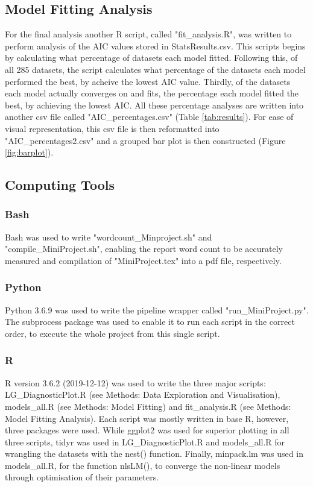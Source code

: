 \documentclass[11pt, a4paper]{article} %
\begin{document}
\subsection{Model Fitting Analysis}

For the final analysis another R script, called "fit\_analysis.R", was written to perform analysis of the AIC values stored in StatsResults.csv. This scripts begins by calculating what percentage of datasets each model fitted. Following this, of all 285 datasets, the script calculates what percentage of the datasets each model performed the best, by acheive the lowest AIC value. Thirdly, of the datasets each model actually converges on and fits, the percentage each model fitted the best, by achieving the lowest AIC. All these percentage analyses are written into another csv file called "AIC\_percentages.csv" (Table \ref{tab:results}). For ease of visual representation, this csv file is then reformatted into "AIC\_percentages2.csv" and a grouped bar plot is then constructed (Figure \ref{fig:barplot}). 

\subsection{Computing Tools} 

\subsubsection{Bash}

Bash was used to write "wordcount\_Minproject.sh" and "compile\_MiniProject.sh", enabling the report word count to be accurately measured and compilation of "MiniProject.tex" into a pdf file, respectively.

\subsubsection{Python}

Python 3.6.9 was used to write the pipeline wrapper called "run\_MiniProject.py". The subprocess package was used to enable it to run each script in the correct order, to execute the whole project from this single script.

\subsubsection{R}

R version 3.6.2 (2019-12-12) was used to write the three major scripts: LG\_DiagnosticPlot.R (see Methods: Data Exploration and Visualisation), models\_all.R (see Methods: Model Fitting) and fit\_analysis.R (see Methods: Model Fitting Analysis). Each script was mostly written in base R, however, three packages were used. While ggplot2 was used for superior plotting in all three scripts, tidyr was used in LG\_DiagnosticPlot.R and models\_all.R for wrangling the datasets with the nest() function. Finally, minpack.lm was used in models\_all.R, for the function nlsLM(), to converge the non-linear models through optimisation of their parameters.
\end{document}
